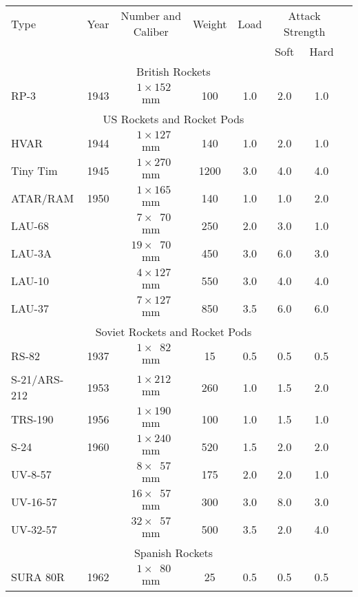 \begin{twocolumntablefloat}
\begin{twocolumntable}
\begin{tabular}{lrcccccl}
\toprule
Type&
Year&
Number and Caliber&
Weight&
Load&
\multicolumn{2}{c}{Attack Strength}\\
\cmidrule{6-7}
&&&&&Soft&Hard\\
\midrule
\multicolumn{7}{c}{British Rockets}\\
\midrule
RP-3     &1943&$\phantom{0}1 \times \phantom{}152$ mm&\phantom{0}100&1.0&2.0&1.0\\
\midrule
\multicolumn{7}{c}{US Rockets and Rocket Pods}\\
\midrule
HVAR            &1944&$\phantom{0}1 \times \phantom{}127$ mm&\phantom{0}140&1.0&2.0&1.0\\
Tiny Tim        &1945&$\phantom{0}1 \times \phantom{}270$ mm&\phantom{}1200&3.0&4.0&4.0\\
ATAR/RAM        &1950&$\phantom{0}1 \times \phantom{}165$ mm&\phantom{0}140&1.0&1.0&2.0\\
LAU-68          &    &$\phantom{0}7 \times \phantom{0}70$ mm&\phantom{0}250&2.0&3.0&1.0\\
LAU-3A          &    &$\phantom{}19 \times \phantom{0}70$ mm&\phantom{0}450&3.0&6.0&3.0\\
LAU-10          &    &$\phantom{0}4 \times \phantom{}127$ mm&\phantom{0}550&3.0&4.0&4.0\\
LAU-37          &    &$\phantom{0}7 \times \phantom{}127$ mm&\phantom{0}850&3.5&6.0&6.0\\
\midrule
\multicolumn{7}{c}{Soviet Rockets and Rocket Pods}\\
\midrule
RS-82           &1937&$\phantom{0}1 \times \phantom{0}82$ mm&\phantom{00}15&0.5&0.5&0.5\\
S-21/ARS-212    &1953&$\phantom{0}1 \times \phantom{}212$ mm&\phantom{0}260&1.0&1.5&2.0\\
TRS-190         &1956&$\phantom{0}1 \times \phantom{}190$ mm&\phantom{0}100&1.0&1.5&1.0\\
S-24            &1960&$\phantom{0}1 \times \phantom{}240$ mm&\phantom{0}520&1.5&2.0&2.0\\
UV-8-57         &    &$\phantom{0}8 \times \phantom{0}57$ mm&\phantom{0}175&2.0&2.0&1.0\\
UV-16-57        &    &$\phantom{}16 \times \phantom{0}57$ mm&\phantom{0}300&3.0&8.0&3.0\\
UV-32-57        &    &$\phantom{}32 \times \phantom{0}57$ mm&\phantom{0}500&3.5&2.0&4.0\\
\midrule
\multicolumn{7}{c}{Spanish Rockets}\\
\midrule
SURA 80R        &1962&$\phantom{0}1 \times \phantom{0}80$ mm&\phantom{00}25&0.5&0.5&0.5\\
\bottomrule
\end{tabular}
\end{twocolumntable}
\end{twocolumntablefloat}